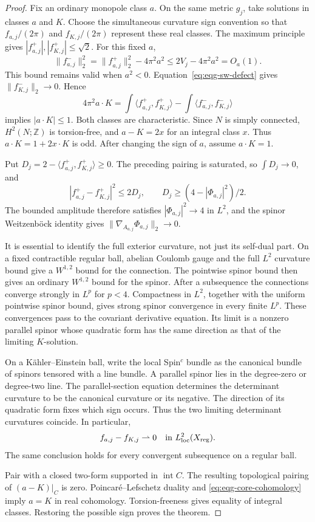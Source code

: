 \begin{proof}
Fix an ordinary monopole class $a$.  On the same metric $g_j$, take
solutions in classes $a$ and $K$.  Choose the simultaneous curvature
sign convention so that $f_{a,j}/(2\pi)$ and $f_{K,j}/(2\pi)$ represent
these real classes.  The maximum principle gives
$|f_{a,j}^+|,|f_{K,j}^+|\leq\sqrt2$.  For this fixed $a$,
\[
 \|f_{a,j}^-\|_2^2
 =\|f_{a,j}^+\|_2^2-4\pi^2a^2
 \leq2V_j-4\pi^2a^2=O_a(1).
\]
This bound remains valid when $a^2<0$.
Equation~\eqref{eq:eqg-sw-defect} gives
$\|f_{K,j}^-\|_2\to0$.  Hence
\[
 4\pi^2a\cdot K
 =\int\langle f_{a,j}^+,f_{K,j}^+\rangle
       -\int\langle f_{a,j}^-,f_{K,j}^-\rangle
\]
implies $|a\cdot K|\leq1$.
Both classes are characteristic.  Since $N$ is simply connected,
$H^2(N;\mathbb Z)$ is torsion-free, and $a-K=2x$ for an integral
class $x$.  Thus $a\cdot K=1+2x\cdot K$ is odd.  After changing the
sign of $a$, assume $a\cdot K=1$.

Put $D_j=2-\langle f_{a,j}^+,f_{K,j}^+\rangle\geq0$.
The preceding pairing is saturated, so $\int D_j\to0$, and
\[
 |f_{a,j}^+-f_{K,j}^+|^2\leq2D_j,
 \qquad D_j\geq(4-|\Phi_{a,j}|^2)/2.
\]
The bounded amplitude therefore satisfies $|\Phi_{a,j}|^2\to4$
in $L^2$, and the spinor Weitzenböck identity gives
$\|\nabla_{A_{a,j}}\Phi_{a,j}\|_2\to0$.

It is essential to identify the full exterior curvature, not just its
self-dual part.  On a fixed contractible regular ball, abelian Coulomb
gauge and the full $L^2$ curvature bound give a $W^{1,2}$ bound for the
connection.  The pointwise spinor bound then gives an ordinary
$W^{1,2}$ bound for the spinor.  After a subsequence the connections
converge strongly in $L^p$ for $p<4$.  Compactness in $L^2$, together
with the uniform pointwise spinor bound, gives strong spinor convergence
in every finite $L^p$.  These convergences pass to the covariant
derivative equation.  Its limit is a nonzero parallel spinor whose
quadratic form has the same direction as that of the limiting
$K$-solution.

On a Kähler--Einstein ball, write the local Spin$^c$ bundle as the
canonical bundle of spinors tensored with a line bundle.  A parallel
spinor lies in the degree-zero or degree-two line.  The parallel-section
equation determines the determinant curvature to be the canonical
curvature or its negative.  The direction of its quadratic form fixes
which sign occurs.  Thus the two limiting determinant curvatures
coincide.  In particular,
\[
 f_{a,j}-f_{K,j}\rightharpoonup0
 \quad\hbox{in }L^2_{\rm loc}(X_{\rm reg}).
\]
The same conclusion holds for every convergent subsequence on a
regular ball.

Pair with a closed two-form supported in $\operatorname{int}C$.
The resulting topological pairing of $(a-K)|_C$ is zero.
Poincaré--Lefschetz duality and
\eqref{eq:eqg-core-cohomology} imply $a=K$ in real cohomology.
Torsion-freeness gives equality of integral classes.  Restoring the
possible sign proves the theorem.
\end{proof}

